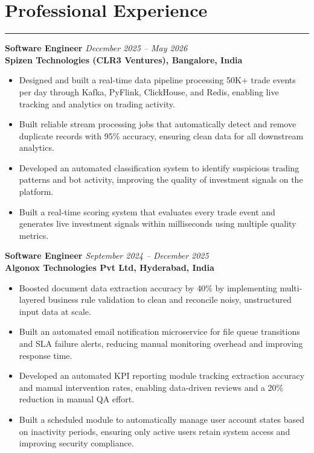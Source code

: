 \documentclass[10pt]{article}
\begin{document}
\section*{Professional Experience}
\vspace{1pt}\hrule\vspace{4pt}

\textbf{Software Engineer} \hfill \textit{December 2025 -- May 2026} \\
\textbf{Spizen Technologies (CLR3 Ventures), Bangalore, India}
\begin{itemize}
  \item Designed and built a real-time data pipeline processing 50K+ trade events per day through Kafka, PyFlink, ClickHouse, and Redis, enabling live tracking and analytics on trading activity.
  \item Built reliable stream processing jobs that automatically detect and remove duplicate records with 95\% accuracy, ensuring clean data for all downstream analytics.
  \item Developed an automated classification system to identify suspicious trading patterns and bot activity, improving the quality of investment signals on the platform.
  \item Built a real-time scoring system that evaluates every trade event and generates live investment signals within milliseconds using multiple quality metrics.
\end{itemize}

\textbf{Software Engineer} \hfill \textit{September 2024 -- December 2025} \\
\textbf{Algonox Technologies Pvt Ltd, Hyderabad, India}
\begin{itemize}
  \item Boosted document data extraction accuracy by 40\% by implementing multi-layered business rule validation to clean and reconcile noisy, unstructured input data at scale.
  \item Built an automated email notification microservice for file queue transitions and SLA failure alerts, reducing manual monitoring overhead and improving response time.
  \item Developed an automated KPI reporting module tracking extraction accuracy and manual intervention rates, enabling data-driven reviews and a 20\% reduction in manual QA effort.
  \item Built a scheduled module to automatically manage user account states based on inactivity periods, ensuring only active users retain system access and improving security compliance.
\end{itemize}
\end{document}

